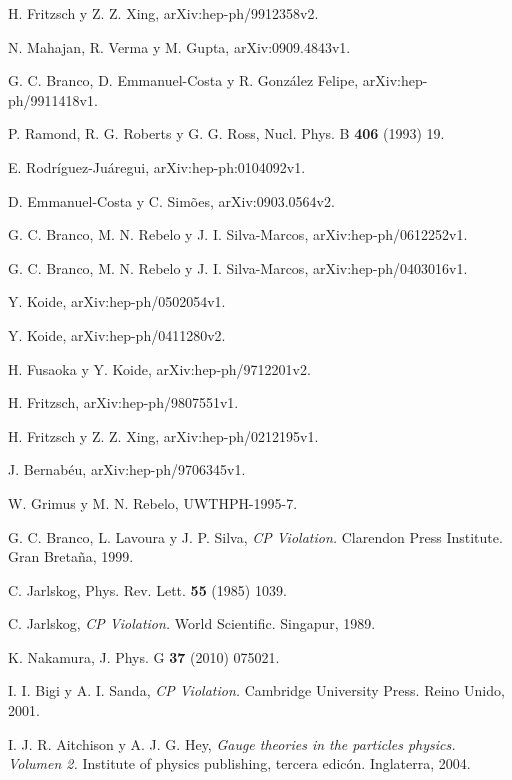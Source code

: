 
 H. Fritzsch y Z. Z. Xing,
 arXiv:hep-ph/9912358v2.

 N. Mahajan, R. Verma y M. Gupta,
arXiv:0909.4843v1.

 G. C. Branco, D. Emmanuel-Costa 
y R. Gonz\'alez Felipe, arXiv:hep-ph/9911418v1.

 P. Ramond, R. G. Roberts y G. G. Ross,
Nucl. Phys. B {\bf 406} (1993) 19.

 E. Rodr\'iguez-Ju\'aregui, 
arXiv:hep-ph:0104092v1.

 D. Emmanuel-Costa y C. 
Sim\~oes, arXiv:0903.0564v2.

 G. C. Branco, M. N. Rebelo y J. 
I. Silva-Marcos, arXiv:hep-ph/0612252v1.

 G. C. Branco, M. N. Rebelo y J. 
I. Silva-Marcos, arXiv:hep-ph/0403016v1.

 Y. Koide, arXiv:hep-ph/0502054v1.

 Y. Koide, arXiv:hep-ph/0411280v2.

 H. Fusaoka y Y. Koide, 
arXiv:hep-ph/9712201v2.

 H. Fritzsch, arXiv:hep-ph/9807551v1.

 H. Fritzsch y Z. Z. Xing,
 arXiv:hep-ph/0212195v1.

 J. Bernab\'eu, 
arXiv:hep-ph/9706345v1.

 W. Grimus y M. N. Rebelo, 
UWTHPH-1995-7.

 G. C. Branco, L. Lavoura y J. P.
Silva, {\em CP Violation.} Clarendon Press Institute. Gran Breta\~na, 1999.

 C. Jarlskog, Phys. Rev. Lett. {\bf 55} 
(1985) 1039.

 C. Jarlskog, {\em CP Violation.} World 
Scientific. Singapur, 1989.

 K. 
Nakamura, J. Phys. G {\bf 37} (2010) 075021.

 I. I. Bigi y A. I. Sanda, {\em CP 
Violation.} Cambridge University Press. Reino Unido, 2001.

 I. J. R. Aitchison y A. J. G.
Hey, {\em Gauge theories in the particles physics. Volumen 2.} Institute of
physics publishing, tercera edic\'on. Inglaterra, 2004.

